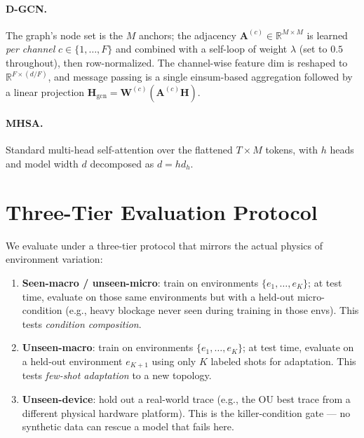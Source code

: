 \documentclass[11pt,letterpaper]{article}
\newcommand{\R}{\mathbb{R}}
\begin{document}
\paragraph{D-GCN.}
The graph's node set is the $M$ anchors; the adjacency
$\bm{A}^{(c)} \in \R^{M \times M}$ is learned \emph{per channel}
$c \in \{1,\dots,F\}$ and combined with a self-loop of weight
$\lambda$ (set to $0.5$ throughout), then row-normalized. The
channel-wise feature dim is reshaped to
$\R^{F \times (d/F)}$, and message passing is a single
einsum-based aggregation followed by a linear projection
$\bm{H}_{\mathrm{gcn}} = \bm{W}^{(c)} ( \bm{A}^{(c)} \bm{H} )$.

\paragraph{MHSA.}
Standard multi-head self-attention over the flattened
$T \times M$ tokens, with $h$ heads and model width $d$
decomposed as $d = h d_h$.









\section{Three-Tier Evaluation Protocol}
\label{sec:eval}

We evaluate under a three-tier protocol that mirrors the actual
physics of environment variation:
\begin{enumerate}
  \item \textbf{Seen-macro / unseen-micro}: train on environments
    $\{e_1,\dots,e_K\}$; at test time, evaluate on those same
    environments but with a held-out micro-condition (e.g.,
    heavy blockage never seen during training in those envs).
    This tests \emph{condition composition}.
  \item \textbf{Unseen-macro}: train on environments
    $\{e_1,\dots,e_K\}$; at test time, evaluate on a held-out
    environment $e_{K+1}$ using only $K$ labeled shots for
    adaptation. This tests \emph{few-shot adaptation} to a new
    topology.
  \item \textbf{Unseen-device}: hold out a real-world trace (e.g.,
    the OU best trace from a different physical hardware
    platform). This is the killer-condition gate --- no synthetic
    data can rescue a model that fails here.
\end{enumerate}
\end{document}
